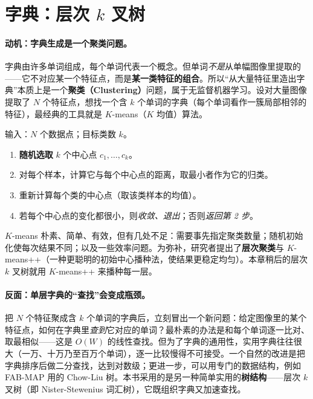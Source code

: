 \section{字典：层次 \texorpdfstring{$k$}{k} 叉树}
\label{sec:loop-dict}

\paragraph{动机：字典生成是一个聚类问题。}
字典由许多单词组成，每个单词代表一个概念。但单词\emph{不是}从单幅图像里提取的——它不对应某一个特征点，而是\textbf{某一类特征的组合}\cite{gaoxiang2019slam14}。所以“从大量特征里造出字典”本质上是一个\textbf{聚类（Clustering）}问题，属于无监督机器学习。设对大量图像提取了 $N$ 个特征点，想找一个含 $k$ 个单词的字典（每个单词看作一簇局部相邻的特征），最经典的工具就是 $K$-means（$K$ 均值）算法。

\begin{algo}[$K$-means 聚类]\label{alg:loop-kmeans}
输入：$N$ 个数据点；目标类数 $k$。
\begin{enumerate}
  \item \textbf{随机选取} $k$ 个中心点 $c_1,\dots,c_k$。
  \item 对每个样本，计算它与每个中心点的距离，取最小者作为它的归类。
  \item 重新计算每个类的中心点（取该类样本的均值）。
  \item 若每个中心点的变化都很小，则\emph{收敛、退出}；否则\emph{返回第 2 步}。
\end{enumerate}
\end{algo}

\noindent $K$-means 朴素、简单、有效，但有几处不足\cite{gaoxiang2019slam14}：需要事先指定聚类数量；随机初始化使每次结果不同；以及一些效率问题。为弥补，研究者提出了\textbf{层次聚类}与 $K$-means++（一种更聪明的初始中心播种法，使结果更稳定均匀）。本章稍后的层次 $k$ 叉树就用 $K$-means++ 来播种每一层。

\paragraph{反面：单层字典的“查找”会变成瓶颈。}
把 $N$ 个特征聚成含 $k$ 个单词的字典后，立刻冒出一个新问题\cite{gaoxiang2019slam14}：给定图像里的某个特征点，如何在字典里\emph{查到}它对应的单词？最朴素的办法是和每个单词逐一比对、取最相似——这是 $O(W)$ 的线性查找。但为了字典的通用性，实用字典往往很大（一万、十万乃至百万个单词），逐一比较慢得不可接受。一个自然的改进是把字典排序后做二分查找，达到对数级；更进一步，可以用专门的数据结构，例如 FAB-MAP\cite{cummins2008fabmap} 用的 Chow-Liu 树。本书采用的是另一种简单实用的\textbf{树结构}——层次 $k$ 叉树（即 Nister-Stewenius 词汇树\cite{nister2006scalable}），它既组织字典又加速查找。

